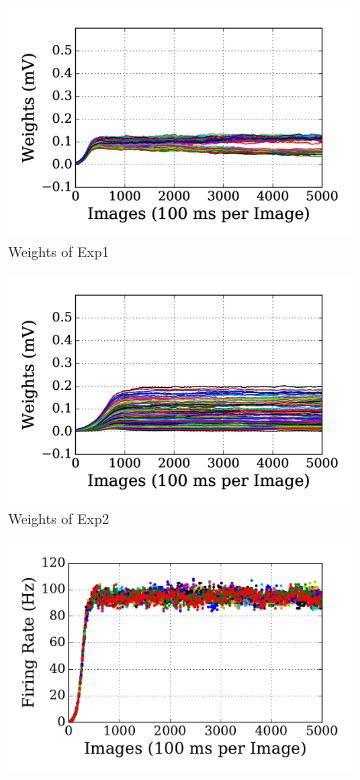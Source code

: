 \begin{figure}
	\centering
	\begin{subfigure}[t]{0.48\textwidth}
		\includegraphics[width=\textwidth]{pics_sdlm/17_exp_SRBM_all_long/exp1_weights_s.png}
		\caption{Weights of Exp1}
	\end{subfigure}
	\begin{subfigure}[t]{0.48\textwidth}
		\includegraphics[width=\textwidth]{pics_sdlm/17_exp_SRBM_all_long/exp2_weights_s.png}
		\caption{Weights of Exp2}
	\end{subfigure}
	\begin{subfigure}[t]{0.48\textwidth}
		\includegraphics[width=\textwidth]{pics_sdlm/17_exp_SRBM_all_long/exp1_recon_s.pdf}

\end{subfigure}
\end{figure}
